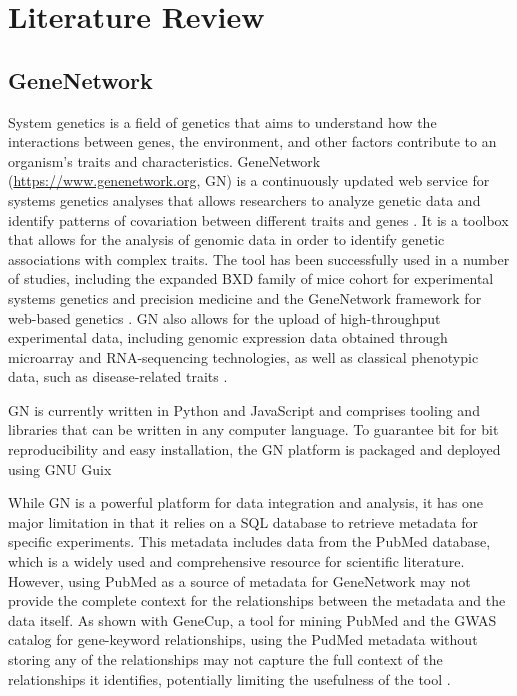 \section{Literature Review}
\subsection{GeneNetwork}
System genetics is a field of genetics that aims to understand how the interactions between genes, the environment, and other factors contribute to an organism's traits and characteristics.  GeneNetwork (\url{https://www.genenetwork.org}, GN) is a continuously updated web service for systems genetics analyses that allows researchers to analyze genetic data and identify patterns of covariation between different traits and genes \citep{mulligan2017genenetwork}.  It is a toolbox that allows for the analysis of genomic data in order to identify genetic associations with complex traits. The tool has been successfully used in a number of studies, including the expanded BXD family of mice cohort for experimental systems genetics and precision medicine \citep{Ashbrook:2019} and the GeneNetwork framework for web-based genetics \citep{sloan2016genenetwork}.  GN also allows for the upload of high-throughput experimental data, including genomic expression data obtained through microarray and RNA-sequencing technologies, as well as classical phenotypic data, such as disease-related traits \citep{Anderson:2021}.

GN is currently written in Python and JavaScript and comprises tooling and libraries that can be written in any computer language.  To guarantee bit for bit reproducibility and easy installation, the GN platform is packaged and deployed using GNU Guix \citep{sloan2016genenetwork}

While GN is a powerful platform for data integration and analysis, it has one major limitation in that it relies on a SQL database to retrieve metadata for specific experiments.  This metadata includes data from the PubMed database, which is a widely used and comprehensive resource for scientific literature.  However, using PubMed  as a source of metadata for GeneNetwork may not provide the complete context for the relationships between the metadata and the data itself.  As shown with GeneCup, a tool for mining PubMed and the GWAS catalog for gene-keyword relationships, using the PudMed metadata without storing any of the relationships may not capture the full context of the relationships it identifies, potentially limiting the usefulness of the tool \citep{gunturkun2022genecup}.

